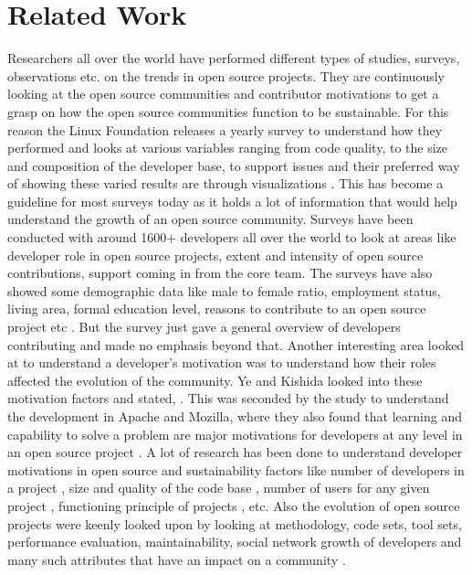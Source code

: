 \documentclass[double,12pt]{beavtex}
\begin{document}
\chapter{Related Work}
Researchers all over the world have performed different types of studies, surveys, observations etc. on the trends in open source projects. They are continuously looking at the open source communities and contributor motivations to get a grasp on how the open source communities function to be sustainable. For this reason the Linux Foundation releases a yearly survey to understand how they performed and looks at various variables ranging from code quality, to the size and composition of the developer base, to support issues and their preferred way of showing these varied results are through visualizations \cite{lfs}. This has become a guideline for most surveys today as it holds a lot of information that would help understand the growth of an open source community. Surveys have been conducted with around 1600+ developers all over the world to look at areas like developer role in open source projects, extent and intensity of open source contributions, support coming in from the core team. The surveys have also showed some demographic data like male to female ratio, employment status, living area, formal education level, reasons to contribute to an open source project etc \cite{david2003}. But the survey just gave a general overview of developers contributing and made no emphasis beyond that. Another interesting area looked at to understand a developer's motivation was to understand how their roles affected the evolution of the community. Ye and Kishida looked into these motivation factors and stated,  \cite{kishida2003}. This was seconded by the study to understand the development in Apache and Mozilla, where they also found that learning and capability to solve a problem are major motivations for developers at any level in an open source project \cite{mockus2002}. A lot of research has been done to understand developer motivations in open source and sustainability factors like number of developers in a project \cite{david2003, rishab2002}, size and quality of the code base \cite{marc2014}, number of users for any given project \cite{rishab2002}, functioning principle of projects \cite{tarja2013}, etc. Also the evolution of open source projects were keenly looked upon by looking at methodology, code sets, tool sets, performance evaluation, maintainability, social network growth of developers and many such attributes that have an impact on a community \cite{tarja2013}. 
\end{document}
